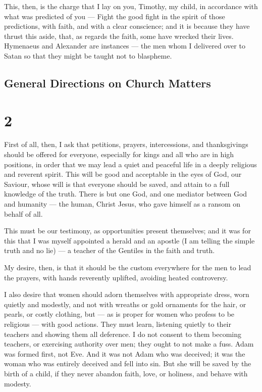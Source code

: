  This, then, is the charge that I lay on you, Timothy, my
child, in accordance with what was predicted of you --- Fight the good
fight in the spirit of those predictions,  with faith, and
with a clear conscience; and it is because they have thrust this aside,
that, as regards the faith, some have wrecked their lives. 
Hymenaeus and Alexander are instances --- the men whom I delivered over
to Satan so that they might be taught not to blaspheme.

\hypertarget{general-directions-on-church-matters}{%
\subsection{General Directions on Church
Matters}\label{general-directions-on-church-matters}}

\hypertarget{section-1}{%
\section{2}\label{section-1}}

 First of all, then, I ask that petitions, prayers,
intercessions, and thanksgivings should be offered for everyone,
 especially for kings and all who are in high positions, in
order that we may lead a quiet and peaceful life in a deeply religious
and reverent spirit.  This will be good and acceptable in
the eyes of God, our Saviour,  whose will is that everyone
should be saved, and attain to a full knowledge of the truth.
 There is but one God, and one mediator between God and
humanity --- the human, Christ Jesus,  who gave himself as a
ransom on behalf of all.

This must be our testimony, as opportunities present themselves;
 and it was for this that I was myself appointed a herald
and an apostle (I am telling the simple truth and no lie) --- a teacher
of the Gentiles in the faith and truth.

 My desire, then, is that it should be the custom everywhere
for the men to lead the prayers, with hands reverently uplifted,
avoiding heated controversy.

 I also desire that women should adorn themselves with
appropriate dress, worn quietly and modestly, and not with wreaths or
gold ornaments for the hair, or pearls, or costly clothing,
 but --- as is proper for women who profess to be religious
--- with good actions.  They must learn, listening quietly
to their teachers and showing them all deference.  I do not
consent to them becoming teachers, or exercising authority over men;
they ought to not make a fuss.  Adam was formed first, not
Eve.  And it was not Adam who was deceived; it was the
woman who was entirely deceived and fell into sin.  But she
will be saved by the birth of a child, if they never abandon faith,
love, or holiness, and behave with modesty.


